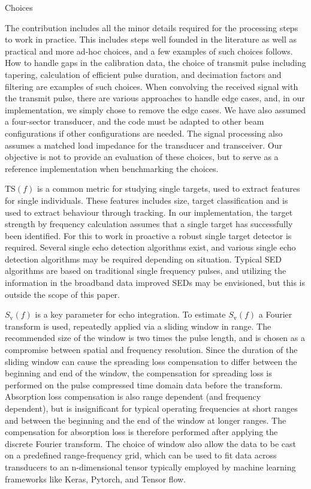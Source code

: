 \documentclass[preprint,12pt,TurnOnLineNumbers]{JASAnew}
\newcommand{\freqsym}{f}
\newcommand{\ts}{\textrm{TS}}
\newcommand{\sv}{S_{\textrm{v}}}
\begin{document}
Choices

The contribution includes all the minor details required for the processing steps to work in practice. This includes steps well founded in the literature as well as practical and more ad-hoc choices, and a few examples of such choices follows. How to handle gaps in the calibration data, the choice of transmit pulse including tapering, calculation of efficient pulse duration, and decimation factors and filtering are examples of such choices. When convolving the received signal with the transmit pulse, there are various approaches to handle edge cases, and, in our implementation, we simply chose to remove the edge cases. We have also assumed a four-sector transducer, and the code must be adapted to other beam configurations if other configurations are needed. The signal processing also assumes a matched load impedance for the transducer and transceiver. Our objective is not to provide an evaluation of these choices, but to serve as a reference implementation when benchmarking the choices.

$\ts(\freqsym)$ is a common metric for studying single targets, used to extract features for single individuals. These features includes size, target classification and is used to extract behaviour through tracking. In our implementation, the target strength by frequency calculation assumes that a single target has successfully been identified. For this to work in proactive a robust single target detector is required. Several single echo detection algorithms exist, and various single echo detection algorithms may be required depending on situation. Typical SED algorithms are based on traditional single frequency pulses, and utilizing the information in the broadband data improved SEDs may be envisioned, but this is outside the scope of this paper.

$\sv(\freqsym)$ is a key parameter for echo integration. To estimate $\sv(\freqsym)$ a Fourier transform is used, repeatedly applied via a sliding window in range. The recommended size of the window is two times the pulse length, and is chosen as a compromise between spatial and frequency resolution. Since the duration of the sliding window can cause the spreading loss compensation to differ between the beginning and end of the window, the compensation for spreading loss is performed on the pulse compressed time domain data before the transform. Absorption loss compensation is also range dependent (and frequency dependent), but is insignificant for typical operating frequencies at short ranges and between the beginning and the end of the window at longer ranges. The compensation for absorption loss is therefore performed after applying the discrete Fourier transform. The choice of window also allow the data to be cast on a predefined range-frequency grid, which can be used to fit data across transducers to an n-dimensional tensor typically employed by machine learning frameworks like Keras, Pytorch, and Tensor flow.
\end{document}

